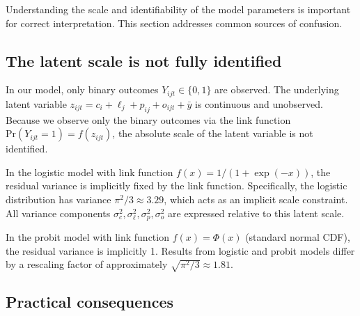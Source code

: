 \documentclass[num-refs]{wiley-article}
\begin{document}
Understanding the scale and identifiability of the model parameters is important for correct interpretation. This section addresses common sources of confusion.

\subsection*{The latent scale is not fully identified}

In our model, only binary outcomes $Y_{ijt} \in \{0,1\}$ are observed. The underlying latent variable $z_{ijt} = c_i + \ell_j + p_{ij} + o_{ijt} + \bar{y}$ is continuous and unobserved. Because we observe only the binary outcomes via the link function $\text{Pr}(Y_{ijt}=1) = f(z_{ijt})$, the absolute scale of the latent variable is not identified.

In the logistic model with link function $f(x) = 1/(1+\exp(-x))$, the residual variance is implicitly fixed by the link function. Specifically, the logistic distribution has variance $\pi^2/3 \approx 3.29$, which acts as an implicit scale constraint. All variance components $\sigma_c^2, \sigma_\ell^2, \sigma_p^2, \sigma_o^2$ are expressed relative to this latent scale.

In the probit model with link function $f(x) = \Phi(x)$ (standard normal CDF), the residual variance is implicitly 1. Results from logistic and probit models differ by a rescaling factor of approximately $\sqrt{\pi^2/3} \approx 1.81$.

\subsection*{Practical consequences}
\end{document}
